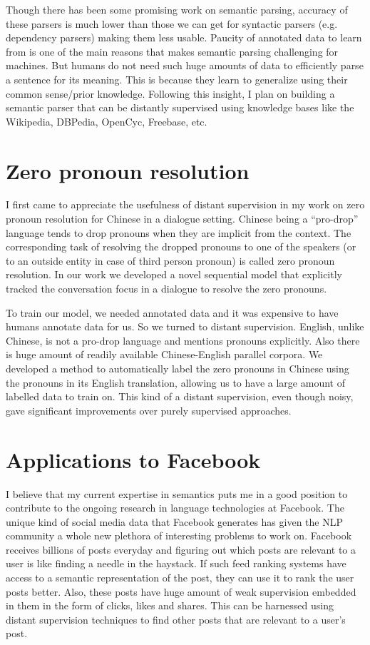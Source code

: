 \documentclass[11pt,a4paper]{article}
\begin{document}
Though there has been some promising work on semantic parsing, accuracy of these parsers is much lower than those we can get for syntactic parsers (e.g. dependency parsers) making them less usable. Paucity of annotated data to learn from is one of the main reasons that makes semantic parsing challenging for machines. But humans do not need such huge amounts of data to efficiently parse a sentence for its meaning. This is because they learn to generalize using their common sense/prior knowledge. Following this insight, I plan on building a semantic parser that can be distantly supervised using knowledge bases like the Wikipedia, DBPedia, OpenCyc, Freebase, etc.

\section{Zero pronoun resolution}
I first came to appreciate the usefulness of distant supervision in my work on zero pronoun resolution for Chinese \cite{rao-EtAl:2015:NAACL-HLT} in a dialogue setting. Chinese being a ``pro-drop'' language tends to drop pronouns when they are implicit from the context. The corresponding task of resolving the dropped pronouns to one of the speakers (or to an outside entity in case of third person pronoun) is called zero pronoun resolution. In our work we developed a novel sequential model that explicitly tracked the conversation focus in a dialogue to resolve the zero pronouns. 

To train our model, we needed annotated data and it was expensive to have humans annotate data for us. So we turned to distant supervision. English, unlike Chinese, is not a pro-drop language and mentions pronouns explicitly. Also there is huge amount of readily available Chinese-English parallel corpora. We developed a method to automatically label the zero pronouns in Chinese using the pronouns in its English translation, allowing us to have a large amount of labelled data to train on. This kind of a distant supervision, even though noisy, gave significant improvements over purely supervised approaches.

\section{Applications to Facebook}
I believe that my current expertise in semantics puts me in a good position to contribute to the ongoing research in language technologies at Facebook. The unique kind of social media data that Facebook generates has given the NLP community a whole new plethora of interesting problems to work on. Facebook receives billions of posts everyday and figuring out which posts are relevant to a user is like finding a needle in the haystack. If such feed ranking systems have access to a semantic representation of the post, they can use it to rank the user posts better. Also, these posts have huge amount of weak supervision embedded in them in the form of clicks, likes and shares. This can be harnessed using distant supervision techniques to find other posts that are relevant to a user's post.
\end{document}
